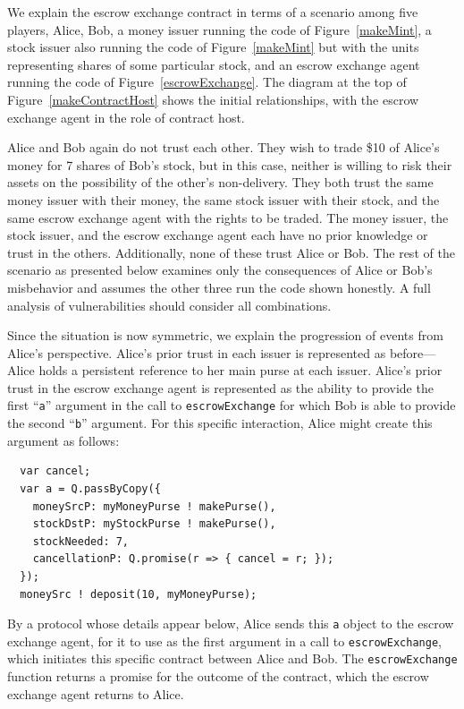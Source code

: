 \documentclass{llncs}
\begin{document}
We explain the escrow exchange contract in terms of a scenario among five players, Alice, Bob, a money issuer running the code of Figure~\ref{makeMint}, a stock issuer also running the code of Figure~\ref{makeMint} but with the units representing shares of some particular stock, and an escrow exchange agent running the code of Figure~\ref{escrowExchange}. The diagram at the top of Figure~\ref{makeContractHost} shows the initial relationships, with the escrow exchange agent in the role of contract host.

Alice and Bob again do not trust each other. They wish to trade \$10 of Alice's money for 7 shares of Bob's stock, but in this case, neither is willing to risk their assets on the possibility of the other's non-delivery. They both trust the same money issuer with their money, the same stock issuer with their stock, and the same escrow exchange agent with the rights to be traded. The money issuer, the stock issuer, and the escrow exchange agent each have no prior knowledge or trust in the others. Additionally, none of these trust Alice or Bob. The rest of the scenario as presented below examines only the consequences of Alice or Bob's misbehavior and assumes the other three run the code shown honestly. A full analysis of vulnerabilities should consider all combinations.

Since the situation is now symmetric, we explain the progression of events from Alice's perspective. Alice's prior trust in each issuer is represented as before---Alice holds a persistent reference to her main purse at each issuer. Alice's prior trust in the escrow exchange agent is represented as the ability to provide the first ``{\tt a}'' argument in the call to {\tt escrowExchange} for which Bob is able to provide the second ``{\tt b}'' argument. For this specific interaction, Alice might create this argument as follows:

\begin{verbatim}
  var cancel;
  var a = Q.passByCopy({
    moneySrcP: myMoneyPurse ! makePurse(),
    stockDstP: myStockPurse ! makePurse(),
    stockNeeded: 7,
    cancellationP: Q.promise(r => { cancel = r; });
  });
  moneySrc ! deposit(10, myMoneyPurse);
\end{verbatim}

By a protocol whose details appear below, Alice sends this {\tt a} object to the escrow exchange agent, for it to use as the first argument in a call to {\tt escrowExchange}, which initiates this specific contract between Alice and Bob. The {\tt escrowExchange} function returns a promise for the outcome of the contract, which the escrow exchange agent returns to Alice. 
\end{document}
